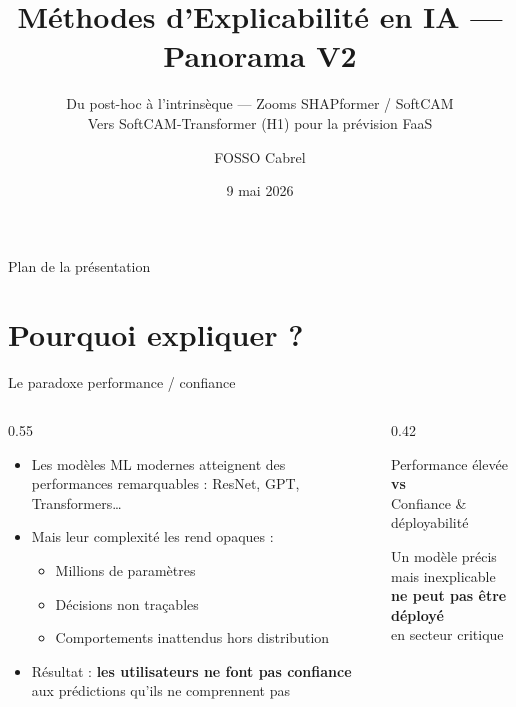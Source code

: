 \documentclass[10pt]{beamer}
\title{Méthodes d'Explicabilité en IA — Panorama V2}
\subtitle{Du post-hoc à l'intrinsèque — Zooms SHAPformer / SoftCAM\\Vers SoftCAM-Transformer (H1) pour la prévision FaaS}
\author{FOSSO Cabrel}
\institute{Université de Dschang}
\date{9 mai 2026}
\begin{document}

\frame{\titlepage}

\begin{frame}{Plan de la présentation}
  \tableofcontents[hideallsubsections]
\end{frame}

\section{Pourquoi expliquer ?}

\begin{frame}{Le paradoxe performance / confiance}
  \begin{columns}
    \begin{column}{0.55\textwidth}
      \begin{itemize}
        \item Les modèles ML modernes atteignent des performances remarquables :
              ResNet, GPT, Transformers\ldots
        \item Mais leur complexité les rend \alert{opaques} :
          \begin{itemize}
            \item Millions de paramètres
            \item Décisions non traçables
            \item Comportements inattendus hors distribution
          \end{itemize}
        \item Résultat : \textbf{les utilisateurs ne font pas confiance} aux prédictions
              qu'ils ne comprennent pas
      \end{itemize}
    \end{column}
    \begin{column}{0.42\textwidth}
      \begin{tcolorbox}[colback=red!5, colframe=red!70!black, arc=3mm,
                        fonttitle=\bfseries, title=Dilemme, halign=center]
        Performance élevée\\[4pt]
        \textbf{vs}\\[4pt]
        Confiance \& déployabilité
      \end{tcolorbox}
      \vspace{6pt}
      \begin{tcolorbox}[colback=green!5, colframe=green!50!black, arc=3mm,
                        fonttitle=\bfseries, title=Constat, halign=center]
        Un modèle précis mais inexplicable\\
        \textbf{ne peut pas être déployé}\\
        en secteur critique
      \end{tcolorbox}
    \end{column}
  \end{columns}
\end{frame}
\end{document}
